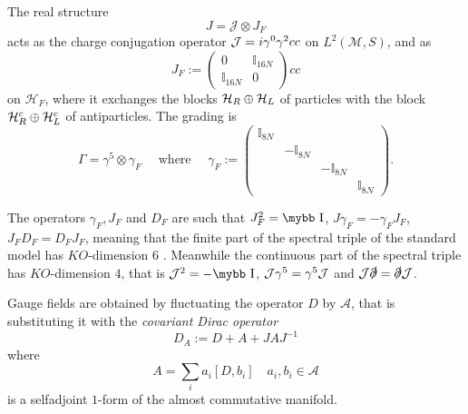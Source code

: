 \documentclass[11pt]{article}
\newcommand{\M}{\mathcal M}
\newcommand{\A}{\mathcal A}
\newcommand{\ds}{\slashed \partial}
\def\bb#1{\hbox{\mybb#1}}
\begin{document}
The real structure
\begin{equation}
J = \mathcal J \otimes J_F\label{eq:46}
\end{equation}
acts as the charge conjugation
operator ${\cal J}= i\gamma^0\gamma^2 cc$
on $L^2(\M,S)$, and as 
\begin{equation}
J_{F}:=\left(\begin{array}{cc}
0 & \mathbb{I}_{16N}\\
\mathbb{I}_{16N} & 0
\end{array}\right) cc
\end{equation}
on $\mathcal H_F$, where it exchanges the blocks ${\cal H}_R\oplus
{\cal H}_L$ of particles with the block ${\cal H}_R^c\oplus
{\cal H}_L^c$ of antiparticles. 
The grading is 
\begin{equation}
\label{graduation}
\Gamma = \gamma^5 \otimes \gamma_F\quad \text{ where } \quad  \gamma_{F}:=\left(\begin{array}{cccc}
\mathbb{I}_{8N}\\
 & -\mathbb{I}_{8N}\\
 &  & -\mathbb{I}_{8N}\\
 &  &  & \mathbb{I}_{8N}
\end{array}\right).\end{equation} 

 The operators $\gamma_F, J_F$ and $D_F$ are such
   that $J_F^2 =\bb I$, $J\gamma_F = - \gamma_F J_F$, $J_F D_F = D_F J_F$, meaning that the finite part of the
   spectral triple of the standard model has $KO$-dimension $6$
   \cite{Barrett:2007vf,Chamseddine:2007oz}.  Meanwhile the continuous part of the spectral triple
   has $KO$-dimension $4$, that is ${\cal J}^2=-\bb I$, ${\cal  J}\gamma^5
   = \gamma^5\cal J$ and ${\cal J}\ds = \ds{\cal J}$.
\bigskip

Gauge fields are obtained by fluctuating the operator $D$ by $\A$, that is
substituting it with the \emph{covariant Dirac operator}
\begin{equation}
  \label{eq:30}
  D_A:= D+ A + JA J^{-1}
\end{equation}
where 
\begin{equation}
  \label{eq:36}
  A = \sum_i a_i [D, b_i]\quad a_i, b_i\in \A
\end{equation}
is a selfadjoint $1$-form of
the almost commutative manifold.
\end{document}
